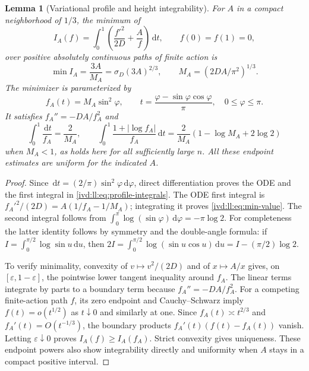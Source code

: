 \documentclass[11pt,letterpaper]{article}
\newtheorem{lemma}[theorem]{Lemma}
\theoremstyle{remark}\newtheorem{remark}[theorem]{Remark}
\numberwithin{equation}{section}
\newcommand{\dd}{\,\mathrm d}
\begin{document}
\begin{lemma}[Variational profile and height integrability]\label{ivd:ll:lem:profile}
For $A$ in a compact neighborhood of $1/3$, the minimum of
\[
 I_A(f)=\int_0^1\left(\frac{f'^2}{2D}+\frac A f\right)\dd t,
 \qquad f(0)=f(1)=0,
\]
over positive absolutely continuous paths of finite action is
\begin{equation}\label{ivd:ll:eq:min-value}
 \min I_A=\frac{3A}{M_A}=\sigma_D(3A)^{2/3},\qquad
 M_A=(2DA/\pi^2)^{1/3}.
\end{equation}
The minimizer is parameterized by
\begin{equation}\label{ivd:ll:eq:profile}
 f_A(t)=M_A\sin^2\varphi,\qquad
 t=\frac{\varphi-\sin\varphi\cos\varphi}{\pi},
 \quad0\le\varphi\le\pi.
\end{equation}
It satisfies $f_A''=-DA/f_A^2$ and
\begin{equation}\label{ivd:ll:eq:profile-integrals}
 \int_0^1\frac{\dd t}{f_A}=\frac2{M_A},\qquad
 \int_0^1\frac{1+|\log f_A|}{f_A}\dd t
 =\frac2{M_A}(1-\log M_A+2\log2)
\end{equation}
when $M_A<1$, as holds here for all sufficiently large $n$.
All these endpoint estimates are uniform for the indicated $A$.
\end{lemma}
\begin{proof}
Since $\dd t=(2/\pi)\sin^2\varphi\dd\varphi$, direct
differentiation proves the ODE and the first integral in
\eqref{ivd:ll:eq:profile-integrals}. The ODE first integral is
$f_A'^2/(2D)=A(1/f_A-1/M_A)$; integrating it proves
\eqref{ivd:ll:eq:min-value}. The second integral follows from
$\int_0^\pi\log(\sin\varphi)\dd\varphi=-\pi\log2$.
For completeness the latter identity follows by symmetry and the
double-angle formula: if $I=\int_0^{\pi/2}\log\sin u\dd u$, then
$2I=\int_0^{\pi/2}\log(\sin u\cos u)\dd u
=I-(\pi/2)\log2$.

To verify minimality, convexity of $v\mapsto v^2/(2D)$ and of
$x\mapsto A/x$ gives, on $[\varepsilon,1-\varepsilon]$, the
pointwise lower tangent inequality around $f_A$.
The linear terms integrate by parts to a boundary term because
$f_A''=-DA/f_A^2$. For a competing finite-action path $f$, its
zero endpoint and Cauchy--Schwarz imply $f(t)=o(t^{1/2})$ as
$t\downarrow0$ and similarly at one. Since
$f_A(t)\asymp t^{2/3}$ and $f_A'(t)=O(t^{-1/3})$, the boundary
products $f_A'(t)(f(t)-f_A(t))$ vanish. Letting
$\varepsilon\downarrow0$ proves $I_A(f)\ge I_A(f_A)$.
Strict convexity gives uniqueness. These endpoint powers also
show integrability directly and uniformity when $A$ stays in a
compact positive interval.
\end{proof}
\end{document}
